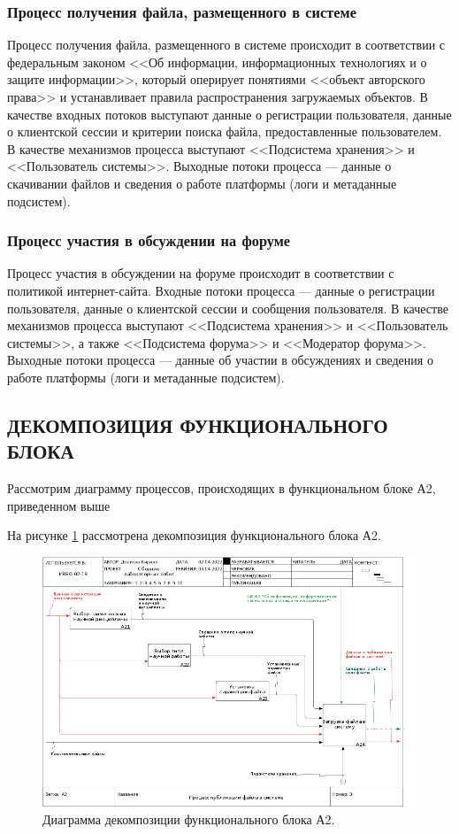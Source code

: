 \documentclass[a4paper,14pt]{extarticle}
\begin{document}
\subsubsection{Процесс получения файла, размещенного в системе}
Процесс получения файла, размещенного в системе происходит в соответствии с федеральным законом <<Об информации, информационных технологиях и о защите информации>>, который оперирует понятиями <<объект авторского права>> и устанавливает правила распространения загружаемых объектов. В качестве входных потоков выступают данные о регистрации пользователя, данные о клиентской сессии и критерии поиска файла, предоставленные пользователем. В качестве механизмов процесса выступают <<Подсистема хранения>> и <<Пользователь системы>>. Выходные потоки процесса --- данные о скачивании файлов и сведения о работе платформы (логи и метаданные подсистем).


\subsubsection{Процесс участия в обсуждении на форуме}
Процесс участия в обсуждении на форуме происходит в соответствии с политикой интернет-сайта. Входные потоки процесса --- данные о регистрации пользователя, данные о клиентской сессии и сообщения пользователя.  В качестве механизмов процесса выступают <<Подсистема хранения>> и <<Пользователь системы>>, а также <<Подсистема форума>> и <<Модератор форума>>. Выходные потоки процесса --- данные об участии в обсуждениях и сведения о работе платформы (логи и метаданные подсистем).

\subsection{ДЕКОМПОЗИЦИЯ ФУНКЦИОНАЛЬНОГО БЛОКА}
Рассмотрим диаграмму процессов, происходящих в функциональном
блоке А2, приведенном выше

На рисунке \ref{fig:03a2} рассмотрена декомпозиция функционального блока А2.

\begin{figure}[h!]
	\centering
	\includegraphics[width=0.9\linewidth]{images/ramus/03_A2}
	\caption{Диаграмма декомпозиции функционального блока А2.}
	\label{fig:03a2}
\end{figure}
\end{document}
